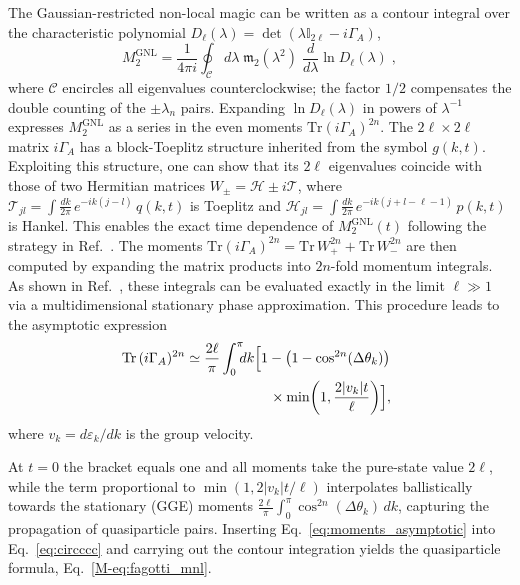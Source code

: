 \documentclass[aps,prl,twocolumn,superscriptaddress,reprint,longbibliography,nofootinbib]{revtex4-2}
\begin{document}
The Gaussian-restricted non-local magic can be written as a contour integral over the characteristic polynomial $D_\ell(\lambda) = \det(\lambda \mathbb{I}_{2\ell} - i\Gamma_A)$,
\begin{equation}
    M_2^{\mathrm{GNL}} = \frac{1}{4\pi i}\oint_\mathcal{C}d\lambda\;\mathfrak{m}_2(\lambda^2)\;\frac{d}{d\lambda}\ln D_\ell(\lambda)\;,\label{eq:circccc}
\end{equation}
where $\mathcal{C}$ encircles all eigenvalues counterclockwise; the factor $1/2$ compensates the double counting of the $\pm\lambda_n$ pairs.
Expanding $\ln D_\ell(\lambda)$ in powers of $\lambda^{-1}$ expresses $M_2^{\mathrm{GNL}}$ as a series in the even moments $\mathrm{Tr}(i\Gamma_A)^{2n}$.
The $2\ell \times 2\ell$ matrix $i\Gamma_A$ has a block-Toeplitz structure inherited from the symbol $g(k,t)$.
Exploiting this structure, one can show that its $2\ell$ eigenvalues coincide with those of two Hermitian matrices $W_\pm = \mathcal{H} \pm i\mathcal{T}$, where $\mathcal{T}_{jl} = \int \frac{dk}{2\pi}\,e^{-ik(j-l)}\,q(k,t)$ is Toeplitz and $\mathcal{H}_{jl} = \int \frac{dk}{2\pi}\,e^{-ik(j+l-\ell-1)}\,p(k,t)$ is Hankel. This enables the exact time dependence of $M_2^\mathrm{GNL}(t)$ following the strategy in Ref.~\cite{Fagotti2008}. 
The moments $\mathrm{Tr}(i\Gamma_A)^{2n} = \mathrm{Tr}\,W_+^{2n} + \mathrm{Tr}\,W_-^{2n}$ are then computed by expanding the matrix products into $2n$-fold momentum integrals.
As shown in Ref.~\cite{Fagotti2008}, these integrals can be evaluated exactly in the limit $\ell \gg 1$ via a multidimensional stationary phase approximation.
This procedure leads to the asymptotic expression\begin{equation}
\begin{split}
   \!\!\! \mathrm{Tr}\,(i\Gamma_A)^{2n}&\simeq \frac{2\ell}{\pi}\int_0^\pi\!\!\!dk\Bigl[1-\bigl(1-\cos^{2n}(\Delta\theta_k)\bigr)\\
   &\qquad\qquad\qquad\times\min\!\left(1, \frac{2|v_k|t}{\ell}\right)\Bigr],
\end{split}
\label{eq:moments_asymptotic}
\end{equation}
where $v_k = d\varepsilon_k/dk$ is the group velocity.

At $t=0$ the bracket equals one and all moments take the pure-state value $2\ell$, while the term proportional to $\min(1,2|v_k|t/\ell)$ interpolates ballistically towards  the stationary (GGE) moments $\frac{2\ell}{\pi}\int_0^\pi\cos^{2n}(\Delta\theta_k)\,dk$, capturing the propagation of quasiparticle pairs.
Inserting Eq.~\eqref{eq:moments_asymptotic} into Eq.~\eqref{eq:circccc} and carrying out the contour integration yields the quasiparticle formula, Eq.~\eqref{M-eq:fagotti_mnl}.
\end{document}
